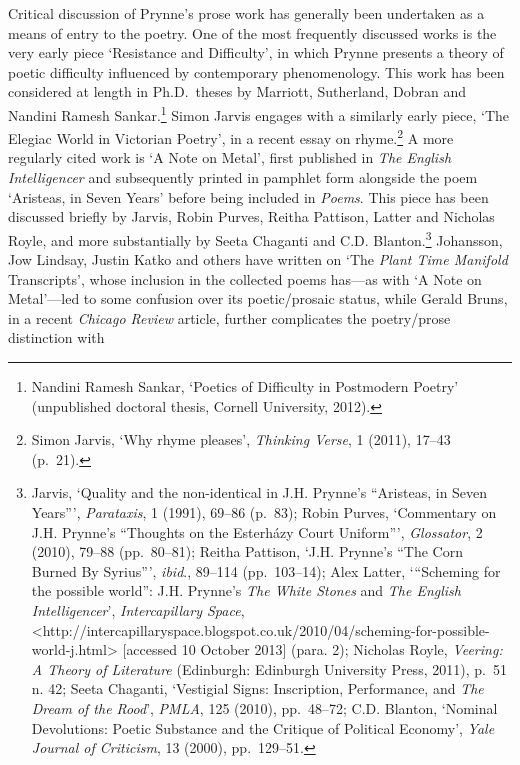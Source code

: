 \documentclass[]{article}
\begin{document}
Critical discussion of Prynne’s prose work has generally been undertaken
as a means of entry to the poetry. One of the most frequently discussed
works is the very early piece ‘Resistance and Difficulty’, in which
Prynne presents a theory of poetic difficulty influenced by contemporary
phenomenology. This work has been considered at length in Ph.D.~theses
by Marriott, Sutherland, Dobran and Nandini Ramesh Sankar.\footnote{Nandini
  Ramesh Sankar, ‘Poetics of Difficulty in Postmodern Poetry’
  (unpublished doctoral thesis, Cornell University, 2012).} Simon Jarvis
engages with a similarly early piece, ‘The Elegiac World in Victorian
Poetry’, in a recent essay on rhyme.\footnote{Simon Jarvis, ‘Why rhyme
  pleases’, \emph{Thinking Verse}, 1 (2011), 17–43 (p.~21).} A more
regularly cited work is ‘A Note on Metal’, first published in \emph{The
English Intelligencer} and subsequently printed in pamphlet form
alongside the poem ‘Aristeas, in Seven Years’ before being included in
\emph{Poems}. This piece has been discussed briefly by Jarvis, Robin
Purves, Reitha Pattison, Latter and Nicholas Royle, and more
substantially by Seeta Chaganti and C.D. Blanton.\footnote{Jarvis,
  ‘Quality and the non-identical in J.H. Prynne’s “Aristeas, in Seven
  Years”’, \emph{Parataxis}, 1 (1991), 69–86 (p.~83); Robin Purves,
  ‘Commentary on J.H. Prynne’s “Thoughts on the Esterházy Court
  Uniform”’, \emph{Glossator}, 2 (2010), 79–88 (pp.~80–81); Reitha
  Pattison, ‘J.H. Prynne’s “The Corn Burned By Syrius”’, \emph{ibid}.,
  89–114 (pp.~103–14); Alex Latter, ‘“Scheming for the possible world”:
  J.H. Prynne’s \emph{The White Stones} and \emph{The English
  Intelligencer}’, \emph{Intercapillary Space},
  \textless{}http://intercapillaryspace.blogspot.co.uk/2010/04/scheming-for-possible-world-j.html\textgreater{}
  {[}accessed 10 October 2013{]} (para. 2); Nicholas Royle,
  \emph{Veering: A Theory of Literature} (Edinburgh: Edinburgh
  University Press, 2011), p.~51 n. 42; Seeta Chaganti, ‘Vestigial
  Signs: Inscription, Performance, and \emph{The Dream of the Rood}’,
  \emph{PMLA}, 125 (2010), pp.~48–72; C.D. Blanton, ‘Nominal
  Devolutions: Poetic Substance and the Critique of Political Economy’,
  \emph{Yale Journal of Criticism}, 13 (2000), pp.~129–51.} Johansson,
Jow Lindsay, Justin Katko and others have written on ‘The \emph{Plant
Time Manifold} Transcripts’, whose inclusion in the collected poems
has—as with ‘A Note on Metal’—led to some confusion over its
poetic/prosaic status, while Gerald Bruns, in a recent \emph{Chicago
Review} article, further complicates the poetry/prose distinction with
\end{document}
